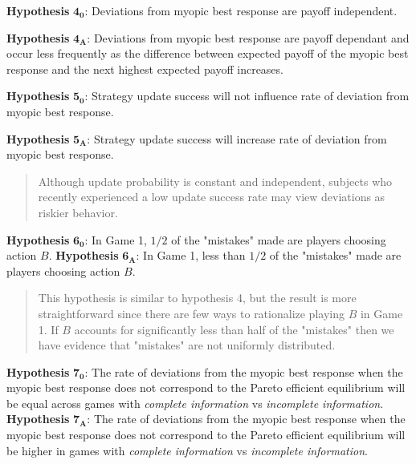 \vskip12pt
\noindent
\textbf{Hypothesis} $\boldsymbol{4_0}$: Deviations from myopic best response are payoff independent.
\vskip6pt

\noindent
\textbf{Hypothesis} $\boldsymbol{4_A}$: Deviations from myopic best response are payoff dependant and occur less frequently as the difference between expected payoff of the myopic best response and the next highest expected payoff increases.
\vskip12pt

\vskip12pt
\noindent
\textbf{Hypothesis} $\boldsymbol{5_0}$: Strategy update success will not influence rate of deviation from myopic best response.

\vskip6pt
\noindent
\textbf{Hypothesis} $\boldsymbol{5_A}$: Strategy update success will increase rate of deviation from myopic best response.


\begin{quote}

Although update probability is constant and independent, subjects who recently experienced a low update success rate may view deviations as riskier behavior.

\end{quote}

\noindent
\textbf{Hypothesis} $\boldsymbol{6_0}$: In Game 1, $1/2$ of the "mistakes" made are players choosing action $B$.
\vskip6pt
\noindent
\textbf{Hypothesis} $\boldsymbol{6_A}$: In Game 1, less than $1/2$ of the "mistakes" made are players choosing action $B$.

\begin{quote}
    This hypothesis is similar to hypothesis 4, but the result is more straightforward since there are few ways to rationalize playing $B$ in Game 1. If $B$ accounts for significantly less than half of the "mistakes" then we have evidence that "mistakes" are not uniformly distributed.
\end{quote}




\vskip12pt
\noindent
\textbf{Hypothesis} $\boldsymbol{7_0}$:  The rate of deviations from the myopic best response when the myopic best response does not correspond to the Pareto efficient equilibrium will be equal across games with \textit{complete information} vs \textit{incomplete information}.
\vskip6pt
\noindent
\textbf{Hypothesis} $\boldsymbol{7_A}$:  The rate of deviations from the myopic best response when the myopic best response does not correspond to the Pareto efficient equilibrium will be higher in games with \textit{complete information} vs \textit{incomplete information}.

